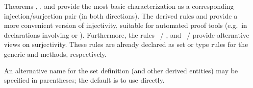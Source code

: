 \begin{isabellebody}
\begin{isamarkuptext}
\begin{description}
  Theorems , , and 
  provide the most basic characterization as a corresponding
  injection/surjection pair (in both directions).  The derived rules
   and  provide a more convenient version of
  injectivity, suitable for automated proof tools (e.g.\ in
  declarations involving \hyperlink{attribute.simp}{\mbox{}} or \hyperlink{attribute.iff}{\mbox{}}).
  Furthermore, the rules ~/ , and ~/
   provide alternative views on
  surjectivity.  These rules are already declared as set or type rules
  for the generic \hyperlink{method.cases}{\mbox{}} and \hyperlink{method.induct}{\mbox{}} methods,
  respectively.

  An alternative name for the set definition (and other derived
  entities) may be specified in parentheses; the default is to use
   directly.

  \end{description}


\end{isamarkuptext}
\end{isabellebody}
